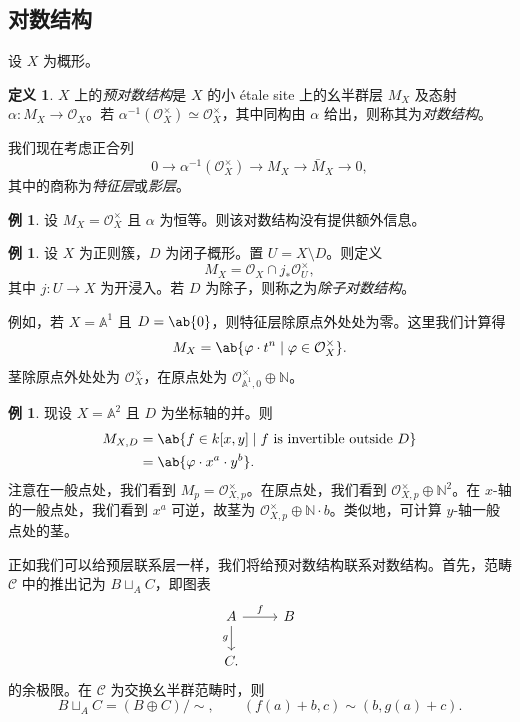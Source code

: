 \documentclass{amsart}
\theoremstyle{definition}
\newtheorem{defn}[thm]{定义}
\newtheorem{exm}[thm]{例}
\theoremstyle{remark}
\theoremstyle{plain}
\theoremstyle{definition}
\theoremstyle{remark}
\newcommand{\A}{\mathbb{A}}
\newcommand{\N}{\mathbb{N}}
\newcommand{\mc}[1]{\mathcal{#1}}
\newcommand{\1}{\mathbf{1}}
\newcommand{\2}{\mathbf{2}}
\newcommand{\3}{\mathbf{3}}
\begin{document}
\subsection{对数结构}%
\label{sub:Log structures}

设 \(X\) 为概形。
\begin{defn}
    \(X\) 上的\textit{预对数结构}是 \(X\) 的小 \'etale site 上的幺半群层 \(M_X\) 及态射 \(\alpha \colon M_X \to \mc{O}_X\)。若 \(\alpha^{-1}(\mc{O}_X^{\times}) \simeq \mc{O}_X^{\times}\)，其中同构由 \(\alpha\) 给出，则称其为\textit{对数结构}。
\end{defn}

我们现在考虑正合列
\[ 0 \to \alpha^{-1}(\mc{O}_X^{\times}) \to M_X \to \bar{M}_X \to 0, \]
其中的商称为\textit{特征层}或\textit{影层}。

\begin{exm}
    设 \(M_X = \mc{O}_X^{\times}\) 且 \(\alpha\) 为恒等。则该对数结构没有提供额外信息。
\end{exm}

\begin{exm}
    设 \(X\) 为正则簇，\(D\) 为闭子概形。置 \(U = X \setminus D\)。则定义
    \[ M_X = \mc{O}_X \cap j_* \mc{O}_U^{\times}, \]
    其中 \(j \colon U \to X\) 为开浸入。若 \(D\) 为除子，则称之为\textit{除子对数结构}。

    例如，若 \(X = \A^1\) 且 \(D = \ab\{0\}\)，则特征层除原点外处处为零。这里我们计算得
    \[ M_X = \ab\{ \varphi \cdot t^n \mid \varphi \in \mc{O}_X^{\times} \}. \]
    茎除原点外处处为 \(\mc{O}_X^{\times}\)，在原点处为 \(\mc{O}_{\A^1, 0}^{\times} \oplus \N\)。
\end{exm}

\begin{exm}
    现设 \(X = \A^2\) 且 \(D\) 为坐标轴的并。则
    \begin{align*}
        M_{X,D} &= \ab\{f \in k[x,y] \mid f \text{ is invertible outside } D \} \\
        &= \ab\{\varphi \cdot x^a \cdot y^b\}.
    \end{align*}
    注意在一般点处，我们看到 \(M_p = \mc{O}_{X,p}^{\times}\)。在原点处，我们看到 \(\mc{O}_{X,p}^{\times}\oplus \N^2\)。在 \(x\)-轴的一般点处，我们看到 \(x^a\) 可逆，故茎为 \(\mc{O}_{X,p}^{\times}\oplus \N \cdot b\)。类似地，可计算 \(y\)-轴一般点处的茎。
\end{exm}

正如我们可以给预层联系层一样，我们将给预对数结构联系对数结构。首先，范畴 \(\mc{C}\) 中的推出记为 \(B \sqcup_A C\)，即图表
\begin{equation*}
\begin{tikzcd}
    A \ar{r}{f} \ar{d}[swap]{g} & B \\
    C.
\end{tikzcd}
\end{equation*}
的余极限。在 \(\mc{C}\) 为交换幺半群范畴时，则
\[ B \sqcup_A C = (B \oplus C)/\sim, \qquad (f(a) + b, c) \sim (b, g(a)+c). \]
\end{document}
